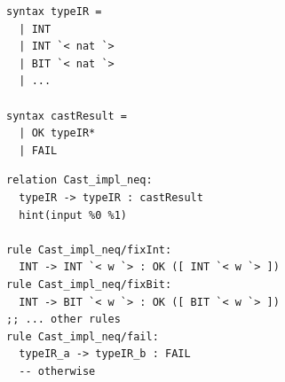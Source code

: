 \begin{examplerow}
\begin{minipage}[t]{0.5\linewidth}
\vspace{0pt}
\begin{lstlisting}[style=spectecexample,style=examplecolumn]
syntax typeIR =
  | INT
  | INT `< nat `>
  | BIT `< nat `>
  | ...

syntax castResult =
  | OK typeIR*
  | FAIL
\end{lstlisting}
\end{minipage}%
\begin{minipage}[t]{0.5\linewidth}
\vspace{0pt}
\begin{lstlisting}[style=spectecexample,style=examplecolumn]
relation Cast_impl_neq:
  typeIR -> typeIR : castResult
  hint(input %0 %1)

rule Cast_impl_neq/fixInt:
  INT -> INT `< w `> : OK ([ INT `< w `> ])
rule Cast_impl_neq/fixBit:
  INT -> BIT `< w `> : OK ([ BIT `< w `> ])
;; ... other rules
rule Cast_impl_neq/fail:
  typeIR_a -> typeIR_b : FAIL
  -- otherwise
\end{lstlisting}
\end{minipage}
\end{examplerow}

